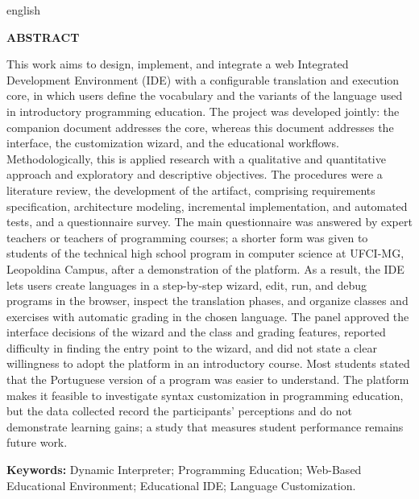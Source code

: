 \documentclass[
        oneside,      %
        english,
        brazil
        ]{configcefetmglpd}
\begin{document}
\begin{abstract_cefetmg}
 \begin{otherlanguage*}{english}


\begin{center}
    \textbf{ABSTRACT}
\end{center}
This work aims to design, implement, and integrate a web Integrated Development Environment (IDE) with a configurable translation and execution core, in which users define the vocabulary and the variants of the language used in introductory programming education. The project was developed jointly: the companion document addresses the core, whereas this document addresses the interface, the customization wizard, and the educational workflows. Methodologically, this is applied research with a qualitative and quantitative approach and exploratory and descriptive objectives. The procedures were a literature review, the development of the artifact, comprising requirements specification, architecture modeling, incremental implementation, and automated tests, and a questionnaire survey. The main questionnaire was answered by expert teachers or teachers of programming courses; a shorter form was given to students of the technical high school program in computer science at UFCI-MG, Leopoldina Campus, after a demonstration of the platform. As a result, the IDE lets users create languages in a step-by-step wizard, edit, run, and debug programs in the browser, inspect the translation phases, and organize classes and exercises with automatic grading in the chosen language. The panel approved the interface decisions of the wizard and the class and grading features, reported difficulty in finding the entry point to the wizard, and did not state a clear willingness to adopt the platform in an introductory course. Most students stated that the Portuguese version of a program was easier to understand. The platform makes it feasible to investigate syntax customization in programming education, but the data collected record the participants' perceptions and do not demonstrate learning gains; a study that measures student performance remains future work.

\noindent \textbf{Keywords:} Dynamic Interpreter; Programming Education; Web-Based Educational Environment; Educational IDE; Language Customization.%

  \end{otherlanguage*}
\end{abstract_cefetmg}
\end{document}
